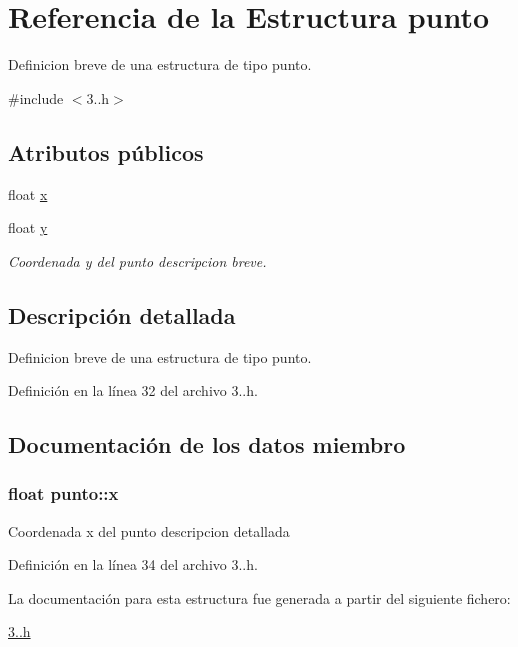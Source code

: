 \hypertarget{structpunto}{}\section{Referencia de la Estructura punto}
\label{structpunto}


Definicion breve de una estructura de tipo punto.  




{\ttfamily \#include $<$3..\+h$>$}

\subsection*{Atributos públicos}
\begin{DoxyCompactItemize}
\item 
float \hyperlink{structpunto_a88ea2198d614083f63658a0df6545157}{x}
\item 
float \hyperlink{structpunto_a2340778f38538d8782bff1e533e39870}{y}\hypertarget{structpunto_a2340778f38538d8782bff1e533e39870}{}\label{structpunto_a2340778f38538d8782bff1e533e39870}

\begin{DoxyCompactList}\small\item\em Coordenada y del punto descripcion breve. \end{DoxyCompactList}\end{DoxyCompactItemize}


\subsection{Descripción detallada}
Definicion breve de una estructura de tipo punto. 

Definición en la línea 32 del archivo 3..\+h.



\subsection{Documentación de los datos miembro}
\subsubsection[{\texorpdfstring{x}{x}}]{\setlength{\rightskip}{0pt plus 5cm}float punto\+::x}\hypertarget{structpunto_a88ea2198d614083f63658a0df6545157}{}\label{structpunto_a88ea2198d614083f63658a0df6545157}
Coordenada x del punto descripcion detallada 

Definición en la línea 34 del archivo 3..\+h.



La documentación para esta estructura fue generada a partir del siguiente fichero\+:\begin{DoxyCompactItemize}
\item 
\hyperlink{3_82_8h}{3..\+h}\end{DoxyCompactItemize}
